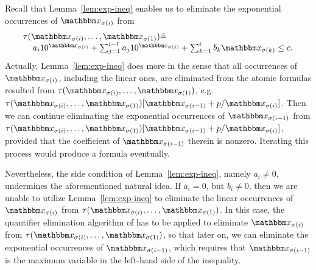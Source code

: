 Recall that Lemma~\ref{lem:exp-ineq} enables us to eliminate the exponential occurrences of $\ivarx_{\sigma(i)}$ from 
$$
\begin{array}{l}
\tau(\ivarx_{\sigma(i)}, \ldots, \ivarx_{\sigma(1)}) \Def  \\
\hspace{4mm} 
a_i 10^{\ivarx_{\sigma(i)}}+\sum_{j=1}^{i-1} a_j 10^{\ivarx_{\sigma(j)}} + \sum_{k=1}^{i}b_k \ivarx_{\sigma(k)} \le c.
\end{array}
$$
Actually, Lemma~\ref{lem:exp-ineq} does more in the sense that all occurrences of $\ivarx_{\sigma(i)}$, including the linear ones, are eliminated from the atomic formulas resulted from $\tau(\ivarx_{\sigma(i)}, \ldots, \ivarx_{\sigma(1)})$, e.g. $\tau(\ivarx_{\sigma(i)}, \ldots, \ivarx_{\sigma(1)})[\ivarx_{\sigma(i-1)} + p /\ivarx_{\sigma(i)}]$. Then we can continue eliminating the exponential occurrences of $\ivarx_{\sigma(i-1)}$ from $\tau(\ivarx_{\sigma(i)}, \ldots, \ivarx_{\sigma(1)})[\ivarx_{\sigma(i-1)} + p /\ivarx_{\sigma(i)}]$, provided that the coefficient of $\ivarx_{\sigma(i-1)}$ therein is nonzero. Iterating this process would produce a {\pa} formula eventually.

Nevertheless, the side condition of Lemma~\ref{lem:exp-ineq}, namely $a_i \neq 0$, undermines the aforementioned natural idea. If $a_i = 0$, but $b_i \neq 0$, 
then we are unable to utilize Lemma~\ref{lem:exp-ineq} to eliminate the linear occurrences of $\ivarx_{\sigma(i)}$ from $\tau(\ivarx_{\sigma(i)}, \ldots, \ivarx_{\sigma(1)})$. In this case, the quantifier elimination algorithm of {\pa} has to be applied to eliminate $\ivarx_{\sigma(i)}$ from $\tau(\ivarx_{\sigma(i)}, \ldots, \ivarx_{\sigma(1)})$, so that later on, we can eliminate the exponential occurrences of $\ivarx_{\sigma(i-1)}$, which requires that $\ivarx_{\sigma(i-1)}$ is the maximum variable in the left-hand side of the inequality.

